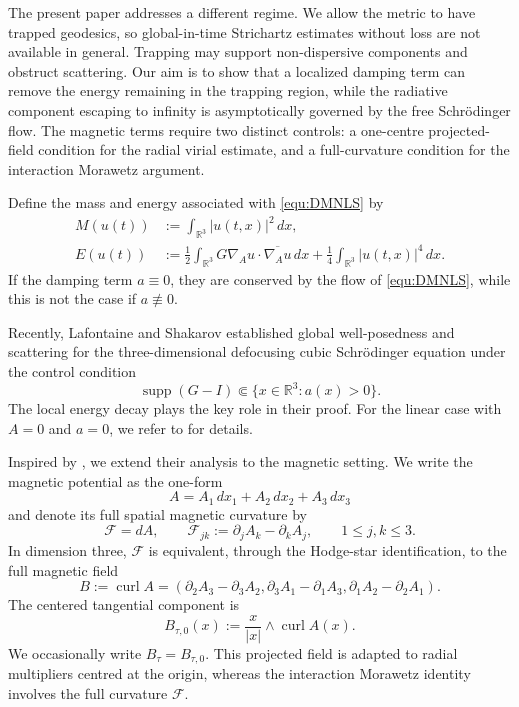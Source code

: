 \documentclass[10pt%
]{amsart}
\numberwithin{equation}{section}
\newcommand{\R}{\mathbb{R}}
\theoremstyle{definition}
\def\curl{\mathop{\mathrm{curl}}\nolimits}
\newcommand{\Fcurv}{\mathcal{F}}
\begin{document}
The present paper addresses a different regime. We allow the metric to have trapped geodesics, so global-in-time Strichartz estimates without loss are not available in general. Trapping may support non-dispersive components and obstruct scattering. Our aim is to show that a localized damping term can remove the energy remaining in the trapping region, while the radiative component escaping to infinity is asymptotically governed by the free Schr\"odinger flow. The magnetic terms require two distinct controls: a one-centre projected-field condition for the radial virial estimate, and a full-curvature condition for the interaction Morawetz argument.

	Define the mass and energy associated with \eqref{equ:DMNLS} by
	\begin{align}\label{equ:massG}
		M(u(t))&:=\int_{\R^3}|u(t,x)|^2\,dx,\\\label{equ:energyG}
		E(u(t))&:=\frac12\int_{\R^3} G\nabla_A u\cdot \overline{\nabla_Au}\,dx+\frac14\int_{\R^3}|u(t,x)|^4\,dx. 
	\end{align}
	If the damping term $a\equiv0$, they are conserved by the flow of \eqref{equ:DMNLS}, while this is not the case if $a\not\equiv0$. 	
	
	Recently, Lafontaine and Shakarov \cite{LS25} established global well-posedness and scattering for the three-dimensional defocusing cubic Schr\"odinger equation  under the control condition
	\begin{equation}\label{equ:assumpona}
		\operatorname{supp}(G-I)\Subset\{x\in\R^3:a(x)>0\}.
	\end{equation}
	The local energy decay plays the key role in their proof. For the linear case with $A=0$ and $a=0$, we refer to \cite{Burq-Bouclet} for details. %
	
	Inspired by \cite{LS25}, we extend their analysis to the magnetic setting. We write the magnetic potential as the one-form
	\[
	A=A_1\,dx_1+A_2\,dx_2+A_3\,dx_3
	\]
	and denote its full spatial magnetic curvature by
	\begin{equation}\label{def:full-curvature}
		\Fcurv=dA,
		\qquad
		\Fcurv_{jk}:=\partial_jA_k-\partial_kA_j,
		\qquad 1\le j,k\le3.
	\end{equation}
	In dimension three, $\Fcurv$ is equivalent, through the Hodge-star identification, to the full magnetic field
	\[
	B:=\curl A=(\partial_2A_3-\partial_3A_2,\partial_3A_1-\partial_1A_3,\partial_1A_2-\partial_2A_1).
	\]
	The centered tangential component is
	\[
	B_{\tau,0}(x):=\frac{x}{|x|}\wedge\curl A(x).
	\]
	We occasionally write $B_\tau=B_{\tau,0}$. This projected field is adapted to radial multipliers centred at the origin, whereas the interaction Morawetz identity involves the full curvature $\Fcurv$.
\end{document}
